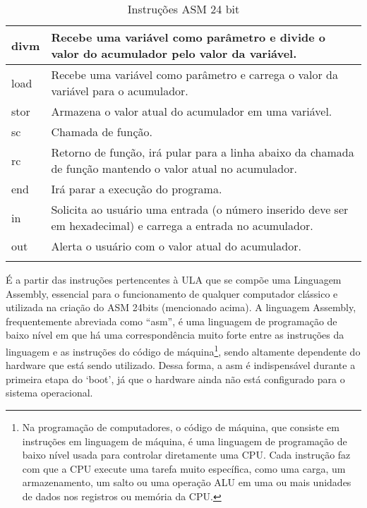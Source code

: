 \begin{longtable}{ |p{3cm}||p{11cm}|  }
  \hline
  divm &
  Recebe uma variável como parâmetro e divide o valor do acumulador pelo valor da variável. \\
  \hline
  load &
  Recebe uma variável como parâmetro e carrega o valor da variável para o acumulador. \\
  \hline
  stor &
  Armazena o valor atual do acumulador em uma variável. \\
  \hline
  sc &
  Chamada de função. \\
  \hline
  rc &
  Retorno de função, irá pular para a linha abaixo da chamada de função mantendo o valor atual no acumulador. \\
  \hline
  end &
  Irá parar a execução do programa. \\
  \hline
  in &
  Solicita ao usuário uma entrada (o número inserido deve ser em hexadecimal) e carrega a entrada no acumulador. \\
  \hline
  out &
  Alerta o usuário com o valor atual do acumulador. \\
  \hline
  \caption{Instruções ASM 24 bit}
  \label{table:2}
\end{longtable}
\vspace{1cm}

É a partir das instruções pertencentes à ULA que se compõe uma  Linguagem Assembly, essencial para o funcionamento de qualquer computador clássico e utilizada na criação do ASM 24bits (mencionado acima). A linguagem Assembly, frequentemente abreviada como ``asm'', é uma linguagem de programação de baixo nível em que há uma correspondência muito forte entre as instruções da linguagem e as instruções do código de máquina\footnote{Na programação de computadores, o código de máquina, que consiste em instruções em linguagem de máquina, é uma linguagem de programação de baixo nível usada para controlar diretamente uma CPU. Cada instrução faz com que a CPU execute uma tarefa muito específica, como uma carga, um armazenamento, um salto ou uma operação ALU em uma ou mais unidades de dados nos registros ou memória da CPU.}, sendo altamente dependente do hardware que está sendo utilizado. Dessa forma, a asm é indispensável durante a primeira etapa do `boot', já que o hardware ainda não está configurado para o sistema operacional. 


